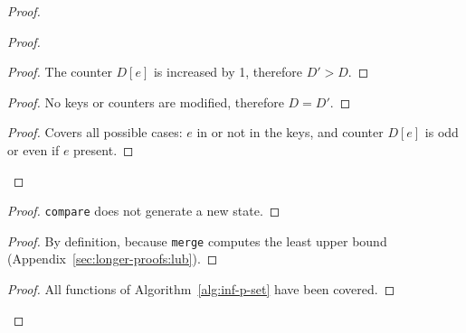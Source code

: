 \documentclass[9pt, oneside]{article}   	%
\begin{document}
\begin{proof}
\begin{proof}
			\begin{proof}
				The counter $D[e]$ is increased by 1, therefore $D' > D$.
			\end{proof}
			
			\begin{proof}
				No keys or counters are modified, therefore $D=D'$.
			\end{proof}
			
			\qedstep
			\begin{proof}
				Covers all possible cases: $e$ in or not in the keys, and counter $D[e]$ is odd or even if $e$ present.
			\end{proof}
		\end{proof}
		
		\begin{proof}
			\texttt{compare} does not generate a new state.
		\end{proof}
		
		\begin{proof}
			By definition, because \texttt{merge} computes the least upper bound (Appendix~\ref{sec:longer-proofs:lub}).
		\end{proof}
	
	\qedstep
	\begin{proof}
		All functions of Algorithm~\ref{alg:inf-p-set} have been covered.
	\end{proof}	
\end{proof}
\end{document}

